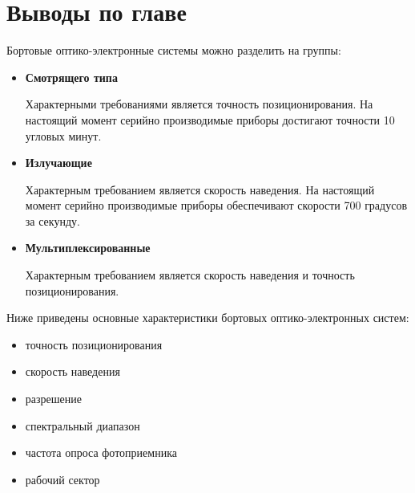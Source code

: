 \section{Выводы по главе} \label{sec:ch1/sec4-}

Бортовые оптико-электронные системы можно разделить на группы:
\begin{itemize}
	\item \textbf{Смотрящего типа}
	
	Характерными требованиями является точность позиционирования. На настоящий момент серийно производимые приборы достигают точности 10 угловых минут.
	
		
	\item \textbf{Излучающие}
	
	Характерным требованием является скорость наведения. На настоящий момент серийно производимые приборы обеспечивают скорости 700 градусов за секунду.
	
	\item \textbf{Мультиплексированные}
	
	Характерным требованием является скорость наведения и точность позиционирования.
	
\end{itemize}

Ниже приведены основные характеристики бортовых оптико-электронных систем: 
\begin{itemize}
\item точность позиционирования  
\item скорость наведения
\item разрешение 
\item спектральный диапазон
\item частота опроса фотоприемника
\item рабочий сектор
\end{itemize}

